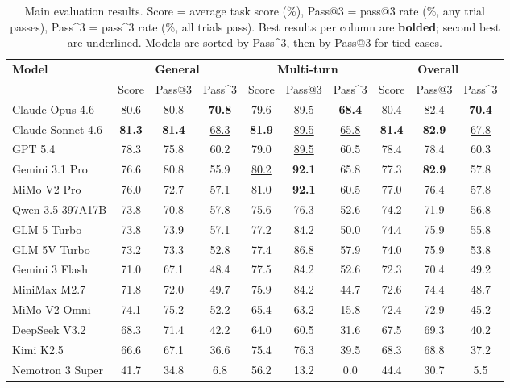 \documentclass{article}
\begin{document}
\begin{table}[t]
\caption{Main evaluation results. Score = average task score (\%), Pass@3 = pass@3 rate (\%, any trial passes), Pass\textasciicircum{}3 = pass\textasciicircum{}3 rate (\%, all trials pass). Best results per column are \textbf{bolded}; second best are \underline{underlined}. Models are sorted by Pass\textasciicircum{}3, then by Pass@3 for tied cases.}
\label{table:experiment_main}
\centering
\small 
\renewcommand{\arraystretch}{1.05}
\begin{tabular}{l|ccc|ccc|ccc}
\toprule
\multirow{2}{*}{\textbf{Model}} & \multicolumn{3}{c|}{\textbf{General}} & \multicolumn{3}{c|}{\textbf{Multi-turn}} & \multicolumn{3}{c}{\textbf{Overall}} \\
\cmidrule(lr){2-4} \cmidrule(lr){5-7} \cmidrule(lr){8-10}
 & Score & Pass@3 & Pass\textasciicircum{}3 & Score & Pass@3 & Pass\textasciicircum{}3 & Score & Pass@3 & Pass\textasciicircum{}3 \\
\midrule
\rowcolor{gray!10}
Claude Opus 4.6       & \underline{80.6} & \underline{80.8} & \textbf{70.8} & 79.6 & \underline{89.5} & \textbf{68.4} & \underline{80.4} & \underline{82.4} & \textbf{70.4} \\
Claude Sonnet 4.6     & \textbf{81.3} & \textbf{81.4} & \underline{68.3} & \textbf{81.9} & \underline{89.5} & \underline{65.8} & \textbf{81.4} & \textbf{82.9} & \underline{67.8} \\
\rowcolor{gray!10}
GPT 5.4               & 78.3 & 75.8 & 60.2 & 79.0 & \underline{89.5} & 60.5 & 78.4 & 78.4 & 60.3 \\
Gemini 3.1 Pro        & 76.6 & 80.8 & 55.9 & \underline{80.2} & \textbf{92.1} & 65.8 & 77.3 & \textbf{82.9} & 57.8 \\
\rowcolor{gray!10}
MiMo V2 Pro           & 76.0 & 72.7 & 57.1 & 81.0 & \textbf{92.1} & 60.5 & 77.0 & 76.4 & 57.8 \\
Qwen 3.5 397A17B         & 73.8 & 70.8 & 57.8 & 75.6 & 76.3 & 52.6 & 74.2 & 71.9 & 56.8 \\
\rowcolor{gray!10}
GLM 5 Turbo           & 73.8 & 73.9 & 57.1 & 77.2 & 84.2 & 50.0 & 74.4 & 75.9 & 55.8 \\
GLM 5V Turbo          & 73.2 & 73.3 & 52.8 & 77.4 & 86.8 & 57.9 & 74.0 & 75.9 & 53.8 \\
\rowcolor{gray!10}
Gemini 3 Flash        & 71.0 & 67.1 & 48.4 & 77.5 & 84.2 & 52.6 & 72.3 & 70.4 & 49.2 \\
MiniMax M2.7           & 71.8 & 72.0 & 49.7 & 75.9 & 84.2 & 44.7 & 72.6 & 74.4 & 48.7 \\
\rowcolor{gray!10}
MiMo V2 Omni          & 74.1 & 75.2 & 52.2 & 65.4 & 63.2 & 15.8 & 72.4 & 72.9 & 45.2 \\
DeepSeek V3.2         & 68.3 & 71.4 & 42.2 & 64.0 & 60.5 & 31.6 & 67.5 & 69.3 & 40.2 \\
\rowcolor{gray!10}
Kimi K2.5             & 66.6 & 67.1 & 36.6 & 75.4 & 76.3 & 39.5 & 68.3 & 68.8 & 37.2 \\
Nemotron 3 Super      & 41.7 & 34.8 &  6.8 & 56.2 & 13.2 &  0.0 & 44.4 & 30.7 &  5.5 \\
\bottomrule
\end{tabular}
\end{table}
\end{document}
